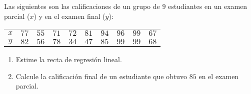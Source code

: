 \begin{enunciado}
 Las siguientes son las calificaciones de un grupo de $9$ estudiantes
 en un examen parcial ($x$) y en el examen final ($y$):
 \begin{center}
  \begin{tabular}{c|ccccccccc}
   $x$ & $77$ & $55$ & $71$ & $72$ & $81$ & $94$ & $96$ & $99$ & $67$ \\
   $y$ & $82$ & $56$ & $78$ & $34$ & $47$ & $85$ & $99$ & $99$ & $68$
  \end{tabular}
 \end{center}
 \begin{enumerate}
  \item Estime la recta de regresi\'on lineal.
  \item Calcule la calificaci\'on final de un estudiante
  que obtuvo $85$ en el examen parcial.
 \end{enumerate}
\end{enunciado}
